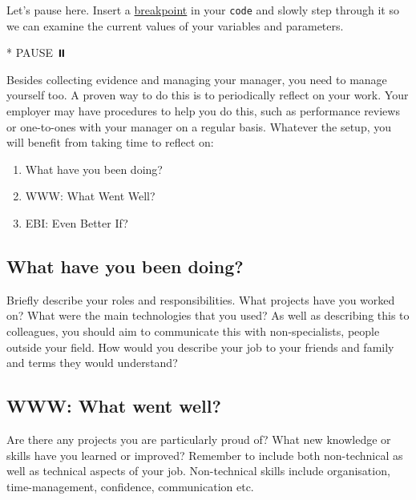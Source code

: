 \documentclass[
]{book}
\newenvironment{Shaded}{\begin{snugshade}}{\end{snugshade}}
\newcommand{\NormalTok}[1]{#1}
\newcommand{\SpecialStringTok}[1]{\textcolor[rgb]{0.31,0.60,0.02}{#1}}
\providecommand{\tightlist}{%
  \setlength{\itemsep}{0pt}\setlength{\parskip}{0pt}}
\begin{document}
Let's pause here. Insert a \href{https://en.wikipedia.org/wiki/Breakpoint}{breakpoint} in your \texttt{code} and slowly step through it so we can examine the current values of your variables and parameters.

\begin{Shaded}
\begin{Highlighting}[]
\SpecialStringTok{* }\NormalTok{PAUSE ⏸️}
\end{Highlighting}
\end{Shaded}

Besides collecting evidence and managing your manager, you need to manage yourself too. A proven way to do this is to periodically reflect on your work. Your employer may have procedures to help you do this, such as performance reviews or one-to-ones with your manager on a regular basis. Whatever the setup, you will benefit from taking time to reflect on:

\begin{enumerate}
\def\labelenumi{\arabic{enumi}.}
\tightlist
\item
  What have you been doing?
\item
  WWW: What Went Well?
\item
  EBI: Even Better If?
\end{enumerate}

\hypertarget{what-have-you-been-doing}{%
\subsection{What have you been doing?}\label{what-have-you-been-doing}}

Briefly describe your roles and responsibilities. What projects have you worked on? What were the main technologies that you used? As well as describing this to colleagues, you should aim to communicate this with non-specialists, people outside your field. How would you describe your job to your friends and family and terms they would understand?

\hypertarget{www-what-went-well}{%
\subsection{WWW: What went well?}\label{www-what-went-well}}

Are there any projects you are particularly proud of? What new knowledge or skills have you learned or improved? Remember to include both non-technical as well as technical aspects of your job. Non-technical skills include organisation, time-management, confidence, communication etc.
\end{document}
